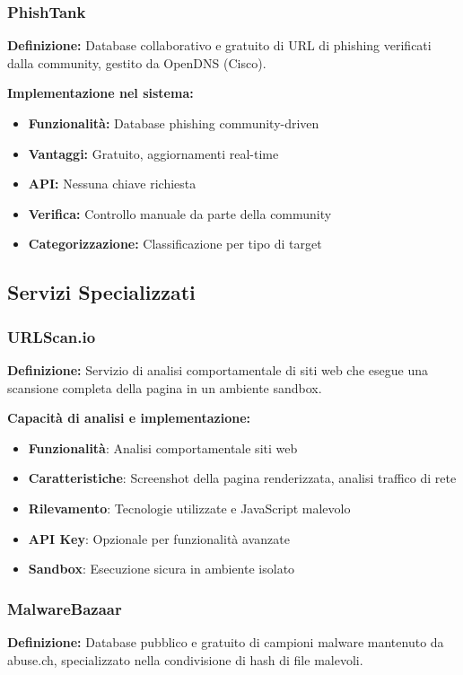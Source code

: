 \documentclass{article}
\begin{document}
\subsubsection{PhishTank}
\textbf{Definizione:} Database collaborativo e gratuito di URL di phishing verificati dalla community, gestito da OpenDNS (Cisco).

\textbf{Implementazione nel sistema:}
\begin{itemize}
    \item \textbf{Funzionalità:} Database phishing community-driven
    \item \textbf{Vantaggi:} Gratuito, aggiornamenti real-time
    \item \textbf{API:} Nessuna chiave richiesta
    \item \textbf{Verifica:} Controllo manuale da parte della community
    \item \textbf{Categorizzazione:} Classificazione per tipo di target
\end{itemize}

\subsection{Servizi Specializzati}

\subsubsection{URLScan.io}
\textbf{Definizione:} Servizio di analisi comportamentale di siti web che esegue una scansione completa della pagina in un ambiente sandbox.

\textbf{Capacità di analisi e implementazione:}
\begin{itemize}
    \item \textbf{Funzionalità}: Analisi comportamentale siti web
    \item \textbf{Caratteristiche}: Screenshot della pagina renderizzata, analisi traffico di rete
    \item \textbf{Rilevamento}: Tecnologie utilizzate e JavaScript malevolo
    \item \textbf{API Key}: Opzionale per funzionalità avanzate
    \item \textbf{Sandbox}: Esecuzione sicura in ambiente isolato
\end{itemize}

\subsubsection{MalwareBazaar}
\textbf{Definizione:} Database pubblico e gratuito di campioni malware mantenuto da abuse.ch, specializzato nella condivisione di hash di file malevoli.
\end{document}
